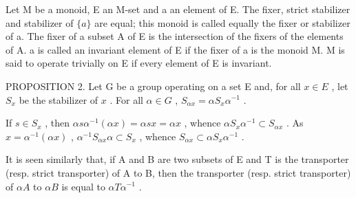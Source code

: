 Let M be a monoid, E an M-set and a an element of E. The fixer, strict stabilizer and stabilizer of \(\{a\}\) are equal; this monoid is called equally the fixer or stabilizer of a. The fixer of a subset A of E is the intersection of the fixers of the elements of A. a is called an invariant element of E if the fixer of a is the monoid M. M is said to operate trivially on E if every element of E is invariant.

PROPOSITION 2. Let G be a group operating on a set E and, for all \(x \in E\) , let \(S_x\) be the stabilizer of \(x\) . For all \(\alpha \in G\) , \(S_{\alpha x} = \alpha S_x \alpha^{-1}\) .

If \(s \in S_x\) , then \(\alpha s \alpha^{-1}(\alpha x) = \alpha s x = \alpha x\) , whence \(\alpha S_x \alpha^{-1} \subset S_{\alpha x}\) . As \(x = \alpha^{-1}(\alpha x)\) , \(\alpha^{-1}S_{\alpha x} \alpha \subset S_x\) , whence \(S_{\alpha x} \subset \alpha S_x \alpha^{-1}\) .

It is seen similarly that, if A and B are two subsets of E and T is the transporter (resp. strict transporter) of A to B, then the transporter (resp. strict transporter) of \(\alpha A\) to \(\alpha B\) is equal to \(\alpha T\alpha^{-1}\) .
